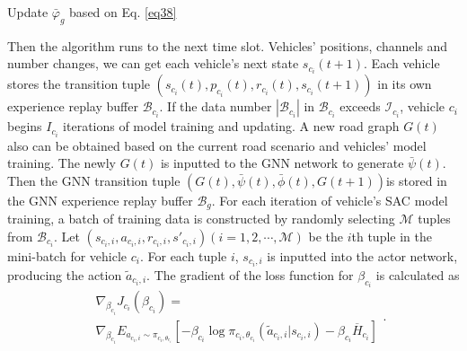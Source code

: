 \documentclass[lettersize,journal,onecolumn]{IEEEtran}
\begin{document}
\begin{algorithm}[b!]
{{{ 			}
 			{
 				Update ${{\bar{\varphi }}_{g}}$ based on Eq. \eqref{eq38}\;
 			}
 		}
 		
	}
	
\end{algorithm}

Then the algorithm runs to the next time slot. Vehicles' positions, channels and number changes, we can get each vehicle's next state ${{s}_{{{c}_{i}}}}(t+1)$. Each vehicle stores the transition tuple $\left( {{s}_{{{c}_{i}}}}(t),{{p}_{{{c}_{i}}}}(t),{{r}_{{{c}_{i}}}}(t),{{s}_{{{c}_{i}}}}(t+1) \right)$ in its own experience replay buffer ${{\mathcal{B}}_{{{c}_{i}}}}$. If the data number $|{{\mathcal{B}}_{{{c}_{i}}}}|$ in ${{\mathcal{B}}_{{{c}_{i}}}}$ exceeds ${{\mathcal{I}}_{{{c}_{i}}}}$, vehicle ${{c}_{i}}$ begins ${{I}_{{{c}_{i}}}}$ iterations of model training and updating. A new road graph $G(t)$ also can be obtained based on the current road scenario and vehicles' model training. The newly $G(t)$ is inputted to the GNN network to generate $\bar{\psi }\left( t \right)$. Then the GNN transition tuple $\left( G(t),\bar{\psi }\left( t \right),\bar{\phi }(t),G(t+1) \right)$is stored in the GNN experience replay buffer ${{\mathcal{B}}_{g}}$. 
For each iteration of vehicle's SAC model training, a batch of training data is constructed by randomly selecting $\mathcal{M}$ tuples from ${{\mathcal{B}}_{{{c}_{i}}}}$. Let $\left( {{s}_{{{c}_{i}},i}},{{a}_{{{c}_{i}},i}},{{r}_{{{c}_{i}},i}},{{{{s}'}}_{{{c}_{i}},i}} \right)(i=1,2,\cdots ,\mathcal{M})$ be the $i$th tuple in the mini-batch for vehicle ${{c}_{i}}$. For each tuple $i$, ${{s}_{{{c}_{i}},i}}$ is inputted into the actor network, producing the action ${{\tilde{a}}_{{{c}_{i}},i}}$. The gradient of the loss function for ${{\beta }_{{{c}_{i}}}}$ is calculated as
\begin{equation}
\begin{aligned}
&{{\nabla }_{{{\beta }_{{{c}_{i}}}}}}{{J}_{{{c}_{i}}}}\left( {{\beta }_{{{c}_{i}}}} \right)= \\
&{{\nabla }_{{{\beta }_{{{c}_{i}}}}}}{{E}_{{{a}_{{{c}_{i}},i}}\sim{{\pi }_{{{c}_{i}},{{\theta }_{{{c}_{i}}}}}}}}\left[ -{{\beta }_{{{c}_{i}}}}\log{{\pi }_{{{c}_{i}},{{\theta }_{{{c}_{i}}}}}}\left( {{{\tilde{a}}}_{{{c}_{i}},i}}|{{s}_{{{c}_{i}},i}} \right)-{{\beta }_{{{c}_{i}}}}{{\overline{H}}_{{{c}_{i}}}} \right]	
\end{aligned}
\label{eq29}.
\end{equation}
\end{document}
